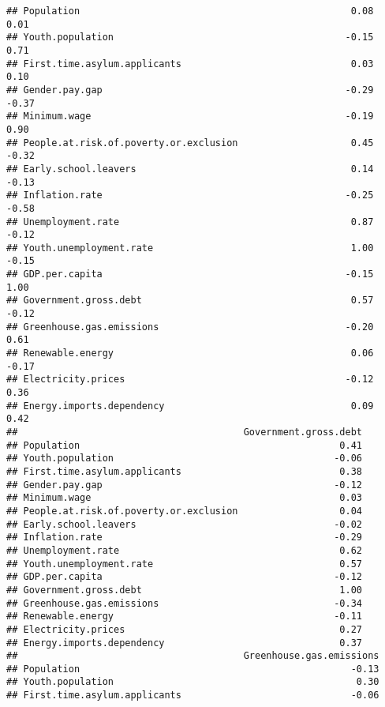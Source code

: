 \documentclass[
]{article}
\begin{document}
\begin{verbatim}
## Population                                                0.08           0.01
## Youth.population                                         -0.15           0.71
## First.time.asylum.applicants                              0.03           0.10
## Gender.pay.gap                                           -0.29          -0.37
## Minimum.wage                                             -0.19           0.90
## People.at.risk.of.poverty.or.exclusion                    0.45          -0.32
## Early.school.leavers                                      0.14          -0.13
## Inflation.rate                                           -0.25          -0.58
## Unemployment.rate                                         0.87          -0.12
## Youth.unemployment.rate                                   1.00          -0.15
## GDP.per.capita                                           -0.15           1.00
## Government.gross.debt                                     0.57          -0.12
## Greenhouse.gas.emissions                                 -0.20           0.61
## Renewable.energy                                          0.06          -0.17
## Electricity.prices                                       -0.12           0.36
## Energy.imports.dependency                                 0.09           0.42
##                                        Government.gross.debt
## Population                                              0.41
## Youth.population                                       -0.06
## First.time.asylum.applicants                            0.38
## Gender.pay.gap                                         -0.12
## Minimum.wage                                            0.03
## People.at.risk.of.poverty.or.exclusion                  0.04
## Early.school.leavers                                   -0.02
## Inflation.rate                                         -0.29
## Unemployment.rate                                       0.62
## Youth.unemployment.rate                                 0.57
## GDP.per.capita                                         -0.12
## Government.gross.debt                                   1.00
## Greenhouse.gas.emissions                               -0.34
## Renewable.energy                                       -0.11
## Electricity.prices                                      0.27
## Energy.imports.dependency                               0.37
##                                        Greenhouse.gas.emissions
## Population                                                -0.13
## Youth.population                                           0.30
## First.time.asylum.applicants                              -0.06

\end{verbatim}
\end{document}

